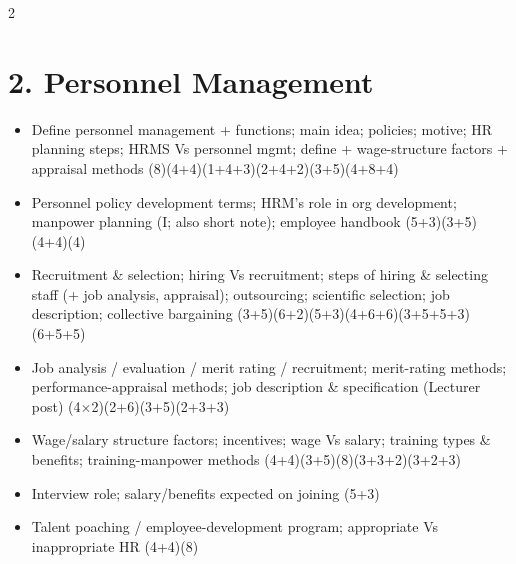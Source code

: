 \documentclass[10pt]{article}
\begin{document}
\begin{multicols}{2}
\section*{2. Personnel Management}
\begin{itemize}
  \item Define personnel management + functions; main idea; policies; motive; HR planning steps; HRMS Vs personnel mgmt; define + wage-structure factors + appraisal methods \hfill (8)(4+4)(1+4+3)(2+4+2)(3+5)(4+8+4)
  \item Personnel policy development terms; HRM's role in org development; manpower planning (I; also short note); employee handbook \hfill (5+3)(3+5)(4+4)(4)
  \item Recruitment \& selection; hiring Vs recruitment; steps of hiring \& selecting staff (+ job analysis, appraisal); outsourcing; scientific selection; job description; collective bargaining \hfill (3+5)(6+2)(5+3)(4+6+6)(3+5+5+3)(6+5+5)
  \item Job analysis / evaluation / merit rating / recruitment; merit-rating methods; performance-appraisal methods; job description \& specification (Lecturer post) \hfill (4$\times$2)(2+6)(3+5)(2+3+3)
  \item Wage/salary structure factors; incentives; wage Vs salary; training types \& benefits; training-manpower methods \hfill (4+4)(3+5)(8)(3+3+2)(3+2+3)
  \item Interview role; salary/benefits expected on joining \hfill (5+3)
  \item Talent poaching / employee-development program; appropriate Vs inappropriate HR \hfill (4+4)(8)
\end{itemize}


\end{multicols}
\end{document}
